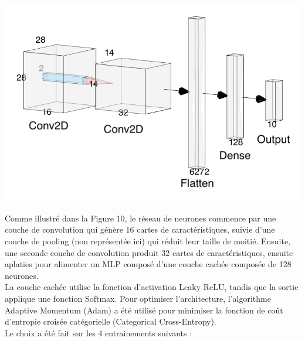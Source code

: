 \begin{multicols}{2}
\includegraphics[width=\columnwidth]{images/mnist_nn.png}
\hfill\break

Comme illustré dans la Figure 10, le réseau de neurones commence par une couche de convolution qui 
génère 16 cartes de caractéristiques, suivie d’une couche de pooling (non représentée ici) qui réduit leur taille de moitié.
Ensuite, une seconde couche de convolution produit 32 cartes de caractéristiques, ensuite aplaties pour alimenter 
un MLP composé d'une couche cachée composée de 128 neurones. \\

La couche cachée utilise la fonction d’activation Leaky ReLU, tandis que la sortie 
applique une fonction Softmax. Pour optimiser l'architecture, l’algorithme Adaptive Momentum (Adam) a été utilisé pour minimiser 
la fonction de coût d’entropie croisée catégorielle (Categorical Cross-Entropy). \\

Le choix a été fait sur les 4 entrainements suivants : \\

\end{multicols}
